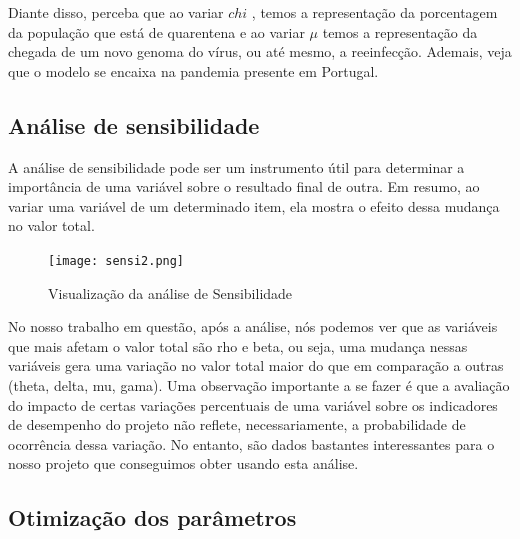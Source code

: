 \documentclass[12pt]{article}
\begin{document}
Diante disso, perceba que ao variar $chi$ , temos a representação da porcentagem da população que está de quarentena e ao variar $\mu$ temos a representação da chegada de um novo genoma do vírus, ou até mesmo, a reeinfecção. Ademais, veja que o modelo se encaixa na pandemia presente em Portugal.

\subsection{Análise de sensibilidade}

A análise de sensibilidade pode ser um instrumento útil para determinar a importância de uma variável sobre o resultado final de outra. Em resumo, ao variar uma variável de um determinado item, ela mostra o efeito dessa mudança no valor total. 

\begin{figure}[H]
    \centering
    \texttt{[image: sensi2.png]}
    \caption{Visualização da análise de Sensibilidade}
\end{figure}
No nosso trabalho em questão, após a análise, nós podemos ver que as variáveis que mais afetam o valor total são rho e beta, ou seja, uma mudança nessas variáveis gera uma variação no valor total maior do que em comparação a outras (theta, delta, mu, gama). Uma observação importante a se fazer é que a avaliação do impacto de certas variações percentuais de uma variável sobre os indicadores de desempenho do projeto não reflete, necessariamente, a probabilidade de ocorrência dessa variação. No entanto, são dados bastantes interessantes para o nosso projeto que conseguimos obter usando esta análise.

\subsection{Otimização dos parâmetros}
\end{document}
